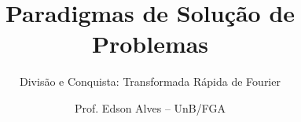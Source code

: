 \title{Paradigmas de Solução de Problemas}
\subtitle{Divisão e Conquista: Transformada Rápida de Fourier}
\author{Prof. Edson Alves -- UnB/FGA}
\date{}
